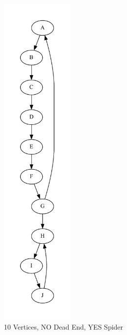 \documentclass{article}
\begin{document}
\begin{figure}
  \centering
  \includegraphics[width=0.32\textwidth]{graph4.pdf}
  \caption{10 Vertices, NO Dead End, YES Spider}
  \label{fig:image_label}
\end{figure}
\end{document}
